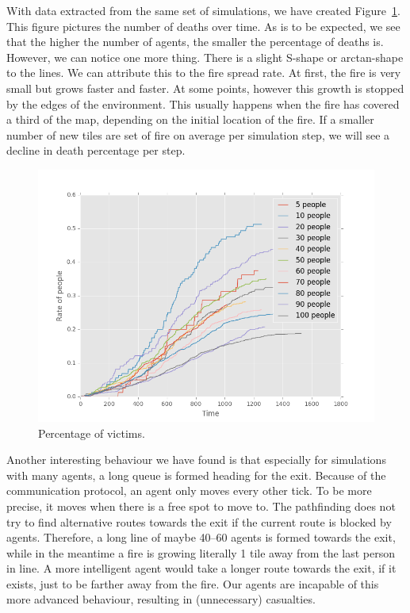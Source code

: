 \documentclass[a4paper]{article}
\begin{document}
With data extracted from the same set of simulations, we have created Figure~\ref{fig:deaths}. This figure pictures the number of deaths over time. As is to be expected, we see that the higher the number of agents, the smaller the percentage of deaths is. However, we can notice one more thing. There is a slight S-shape or arctan-shape to the lines. We can attribute this to the fire spread rate. At first, the fire is very small but grows faster and faster. At some points, however this growth is stopped by the edges of the environment. This usually happens when the fire has covered a third of the map, depending on the initial location of the fire. If a smaller number of new tiles are set of fire on average per simulation step, we will see a decline in death percentage per step.

\begin{figure}[ht]
  \centering
  \includegraphics[width=\linewidth]{deathrate.png}
  \caption{Percentage of victims.}
  \label{fig:deaths}
\end{figure}

Another interesting behaviour we have found is that especially for simulations with many agents, a long queue is formed heading for the exit. Because of the communication protocol, an agent only moves every other tick. To be more precise, it moves when there is a free spot to move to. The pathfinding does not try to find alternative routes towards the exit if the current route is blocked by agents. Therefore, a long line of maybe 40--60 agents is formed towards the exit, while in the meantime a fire is growing literally 1 tile away from the last person in line. A more intelligent agent would take a longer route towards the exit, if it exists, just to be farther away from the fire. Our agents are incapable of this more advanced behaviour, resulting in (unnecessary) casualties. 
\end{document}
